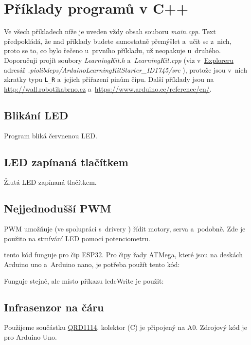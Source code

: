 

\section{Příklady programů v C++}   \label{cpppr}

Ve všech příkladech níže je uveden vždy obsah souboru {\it main.cpp}. 
Text předpokládá, že nad příklady budete samostatně přemýšlet a~učit se z~nich, proto se to, co bylo řečeno u~prvního příkladu, už neopakuje u~druhého.  
Doporučuji projít soubory {\it LearningKit.h}
a~{\it LearningKit.cpp} (viz v~\hyperlink{explorer}{Exploreru}
adresář {\it .piolibdeps/ArduinoLearningKitStarter\_ID1745/src} ), protože jsou v~nich zkratky typu {\tt L\_R} a~jejich přiřazení pinům čipu.
Další příklady jsou na \url{http://wall.robotikabrno.cz} a~\url{https://www.arduino.cc/reference/en/}.  

\label{cpppr1} \subsection{Blikání LED} 

Program bliká červnenou LED.   




\label{cpppr2} \subsection{LED zapínaná tlačítkem} 

Žlutá LED zapínaná tlačítkem.  




\label{cpppr3} \subsection{Nejjednodušší PWM} 

PWM  umožňuje (ve spolupráci
s~drivery ) řídit motory, serva a~podobně. Zde je použito na stmívání LED pomocí potenciometru.  %






tento kód funguje pro čip ESP32. Pro čipy řady ATMega, které jsou na deskách Arduino uno a~Arduino nano, je potřeba použít tento kód: 
 
Funguje stejně, ale místo příkazu ledcWrite je použit:  

\subsection{Infrasenzor na čáru} \label{prog:qrd1114}

Použijeme součástku \hyperref[qrd1114]{QRD1114}, kolektor (C) je připojený na A0. Zdrojový kód je pro Arduino Uno. 

